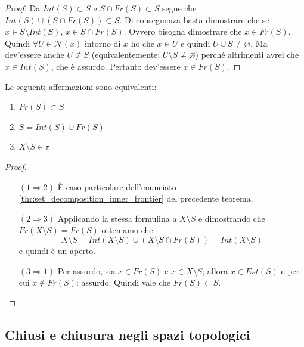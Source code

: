 \begin{proof}
	Da $Int(S)\subset S$ e $S \cap Fr(S) \subset S$ segue che $Int(S) \cup (S \cap Fr(S)) \subset S$. Di conseguenza basta dimostrare che se $x \in S \setminus Int(S)$, $x \in S \cap Fr(S)$. Ovvero bisogna dimostrare che $x \in Fr(S)$. Quindi $\forall U \in \mathcal{N}(x)$ intorno di $x$ ho che $x \in U$ e quindi $U \cup S \neq \varnothing$. Ma dev'essere anche $U \not \subset S$ (equivalentemente: $U \setminus S \neq \varnothing$) perché altrimenti avrei che $x \in Int(S)$, che è assurdo. Pertanto dev'essere $x \in Fr(S)$.
\end{proof}

\begin{corollary}
	Le seguenti affermazioni sono equivalenti:
	\begin{enumerate}
		\item $Fr(S) \subset S$
		\item $S = Int(S) \cup Fr(S)$
		\item $X \setminus S \in \tau$ 
	\end{enumerate}
\end{corollary}

\begin{proof} \
	\begin{enumerate}
		\item[$(1\Rightarrow 2)$] È caso particolare dell'enunciato \ref{thr:set_decomposition_inner_frontier} del precedente teorema.
		\item[$(2 \Rightarrow 3)$] Applicando la stessa formulina a $X \setminus S$ e dimostrando che $Fr(X\setminus S) = Fr(S)$ otteniamo che
		\begin{equation*}
			X \setminus S = Int(X\setminus S) \cup (X \setminus S \cap Fr(S)) = Int(X \setminus S)
		\end{equation*}
		 e quindi è un aperto.
		\item[$(3 \Rightarrow 1)$] Per assurdo, sia $x \in Fr(S)$ e $x \in X \setminus S$; allora $x\in Est(S)$ e per cui $x \notin Fr(S)$: assurdo. Quindi vale che $Fr(S) \subset S$.
	\end{enumerate}
\end{proof}



\subsection{\textcolor{TopGener}{\textbf{Chiusi e chiusura negli spazi topologici}}}




